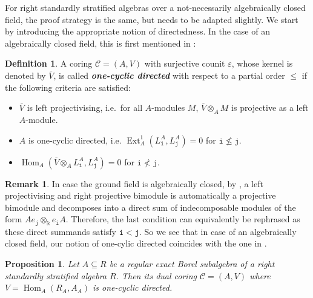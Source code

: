 \documentclass[12pt,a4paper]{amsart}
\theoremstyle{plain}
\newtheorem{prop}[thm]{Proposition}
\theoremstyle{definition}
\newtheorem{defn}[thm]{Definition}
\newtheorem{rmk}[thm]{Remark}
\numberwithin{equation}{thm}
\newcommand{\emphbf}[1]{\emph{\textbf{#1}}}
\DeclareMathOperator{\Hom}{Hom}
\DeclareMathOperator{\Ext}{Ext}
\begin{document}
For right standardly stratified algebras over a not-necessarily algebraically closed field, the proof strategy is the same, but needs to be adapted slightly. We start by introducing the appropriate notion of directedness. In the case of an algebraically closed field, this   is first mentioned in \cite[Definition 3.2]{Got24}:

\begin{defn}
A coring $\mathcal{C}=(A,V)$ with surjective counit $\varepsilon$, whose kernel is denoted by $\overline{V}$, is called \emphbf{one-cyclic directed} with respect to a partial order $\leq$ if the following criteria are satisfied:
\begin{itemize}
\item $\overline{V}$ is left projectivising, i.e.\ for all $A$-modules $M$, $\overline{V}\otimes_A M$ is projective as a left $A$-module. 
\item $A$ is one-cyclic directed, i.e. $\Ext^1_A(L_\mathtt{i}^A,L_\mathtt{j}^A)=0$ for $\mathtt{i}\nleq \mathtt{j}$.
\item $\Hom_A(\overline{V}\otimes_A L_\mathtt{i}^A,L_\mathtt{j}^A)=0$ for $\mathtt{i} \nless   \mathtt{j}$. 
\end{itemize}
\end{defn}

\begin{rmk}
In case the ground field is algebraically closed, by \cite[Theorem 3.1]{AR91b}, a left projectivising and right projective bimodule is automatically a projective bimodule and decomposes into a direct sum of indecomposable modules of the form $Ae_\mathtt{j}\otimes_\Bbbk e_\mathtt{i}A$. Therefore, the last condition can equivalently be rephrased as these direct summands satisfy $\mathtt{i}<\mathtt{j}$. So we see that in case of an algebraically closed field, our notion of one-cylic directed coincides with the one in \cite{Got24}. 
\end{rmk}

\begin{prop}
Let $A\subseteq R$ be a regular exact Borel subalgebra of a right standardly stratified algebra $R$. Then its dual coring $\mathcal{C}=(A,V)$ where $V=\Hom_A(R_A,A_A)$ is one-cyclic directed. 
\end{prop}
\end{document}

